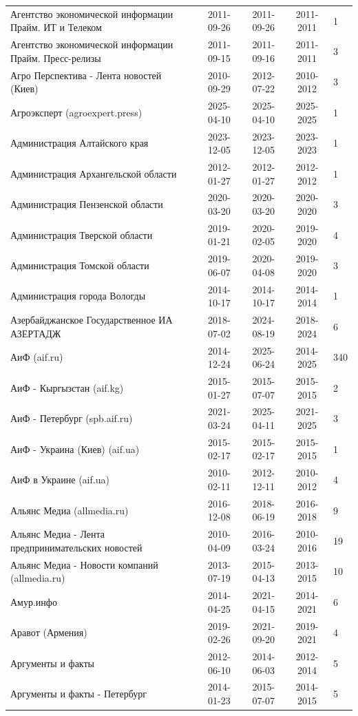 \begin{longtable}{p{6cm}cccp{2cm}}
Агентство экономической информации Прайм. ИТ и Телеком & 2011-09-26 & 2011-09-26 & 2011-2011 & 1\\
Агентство экономической информации Прайм. Пресс-релизы & 2011-09-15 & 2011-09-16 & 2011-2011 & 3\\
Агро Перспектива - Лента новостей (Киев) & 2010-09-29 & 2012-07-22 & 2010-2012 & 3\\
Агроэксперт (agroexpert.press) & 2025-04-10 & 2025-04-10 & 2025-2025 & 1\\
Администрация Алтайского края & 2023-12-05 & 2023-12-05 & 2023-2023 & 1\\
Администрация Архангельской области & 2012-01-27 & 2012-01-27 & 2012-2012 & 1\\
Администрация Пензенской области & 2020-03-20 & 2020-03-20 & 2020-2020 & 3\\
Администрация Тверской области & 2019-01-21 & 2020-02-05 & 2019-2020 & 4\\
Администрация Томской области & 2019-06-07 & 2020-04-08 & 2019-2020 & 3\\
Администрация города Вологды & 2014-10-17 & 2014-10-17 & 2014-2014 & 1\\
Азербайджанское Государственное ИА АЗЕРТАДЖ & 2018-07-02 & 2024-08-19 & 2018-2024 & 6\\
АиФ (aif.ru) & 2014-12-24 & 2025-06-24 & 2014-2025 & 340\\
АиФ - Кыргызстан (aif.kg) & 2015-01-27 & 2015-07-07 & 2015-2015 & 2\\
АиФ - Петербург (spb.aif.ru) & 2021-03-24 & 2025-04-11 & 2021-2025 & 3\\
АиФ - Украина (Киев) (aif.ua) & 2015-02-17 & 2015-02-17 & 2015-2015 & 1\\
АиФ в Украине (aif.ua) & 2010-02-11 & 2012-12-11 & 2010-2012 & 4\\
Альянс Медиа (allmedia.ru) & 2016-12-08 & 2018-06-19 & 2016-2018 & 9\\
Альянс Медиа - Лента предпринимательских новостей & 2010-04-09 & 2016-03-24 & 2010-2016 & 19\\
Альянс Медиа - Новости компаний (allmedia.ru) & 2013-07-19 & 2015-04-13 & 2013-2015 & 10\\
Амур.инфо & 2014-04-25 & 2021-04-15 & 2014-2021 & 6\\
Аравот (Армения) & 2019-02-26 & 2021-09-20 & 2019-2021 & 4\\
Аргументы и факты & 2012-06-10 & 2014-06-03 & 2012-2014 & 5\\
Аргументы и факты - Петербург & 2014-01-23 & 2015-07-07 & 2014-2015 & 5\\

\end{longtable}
